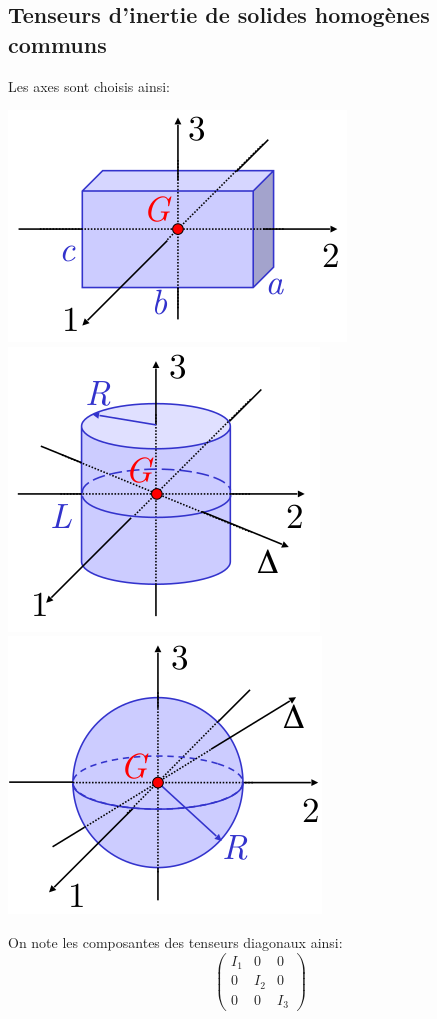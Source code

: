\documentclass{article}
\begin{document}
\subsection{Tenseurs d'inertie de solides homogènes communs}
Les axes sont choisis ainsi:
\begin{center}
\includegraphics[scale=0.5]{IG_brique} \includegraphics[scale=0.5]{IG_cylindre} \includegraphics[scale=0.5]{IG_sphere}
\end{center}
On note les composantes des tenseurs diagonaux ainsi:
\begin{equation*}
	\begin{pmatrix}
		I_1 & 0 & 0\\
		0 & I_2 & 0\\
		0 & 0 & I_3
	\end{pmatrix}
\end{equation*}
\end{document}
